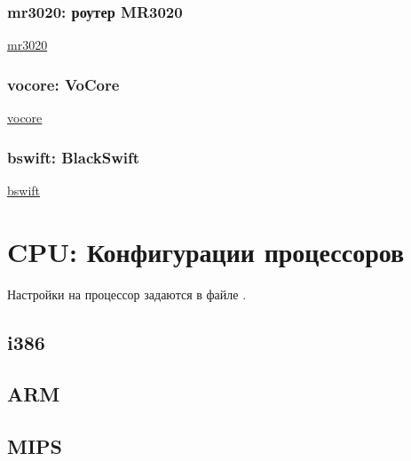 \subsubsection{mr3020: роутер MR3020}
\href{http://wiki.openwrt.org/ru/toh/tp-link/tl-mr3020}{mr3020}
\subsubsection{vocore: VoCore} 
\href{http://vocore.io/}{vocore}
\subsubsection{bswift: BlackSwift}
\href{http://habrahabr.ru/post/242731/}{bswift} 

\section{CPU: Конфигурации процессоров}

Настройки на процессор задаются в файле .

\subsection{i386}



\subsection{ARM}
\subsection{MIPS}



